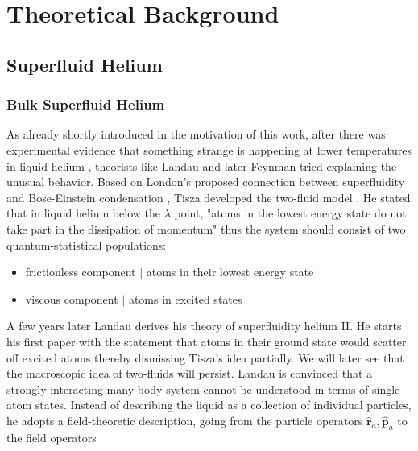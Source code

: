 \chapter{Theoretical Background}
\label{sec:theory}

\section{Superfluid Helium}
\label{sec:superfluidity}
\subsection{Bulk Superfluid Helium}
As already shortly introduced in the motivation of this work, after there was experimental evidence that something strange is happening at lower temperatures in liquid helium \cite{keesomNewMeasurementsSpecific1935a, kapitzaViscosityLiquidHelium1938, allenFlowLiquidHelium1938}, theorists like Landau and later Feynman tried explaining the unusual behavior. Based on London's proposed connection between superfluidity and Bose-Einstein condensation  \cite{londonLPhenomenonLiquidHelium1938}, Tisza developed the two-fluid model \cite{tiszaTransportPhenomenaHelium1938}. He stated that in liquid helium below the $\lambda$ point, "atoms in the lowest energy state do not take part in the dissipation of momentum" thus the system should consist of two quantum-statistical populations:
\begin{itemize}
    \item frictionless component $|$ atoms in their lowest energy state
    \item viscous component $|$ atoms in excited states
\end{itemize}
A few years later Landau derives his theory of superfluidity helium II. He starts his first paper \cite{terhaar46THEORYSUPERFLUIDITY1965, landauTheorySuperfluidityHelium1941} with the statement that atoms in their ground state would scatter off excited atoms thereby dismissing Tisza's idea partially. We will later see that the macroscopic idea of two-fluids will persist. 
Landau is convinced that a strongly interacting many-body system cannot be understood in terms of single-atom states. Instead of describing the liquid as a collection of individual particles, he adopts a field-theoretic description, going from the particle operators $\hat{\mathbf r}_a, \hat{\mathbf p}_a$ to the field operators
